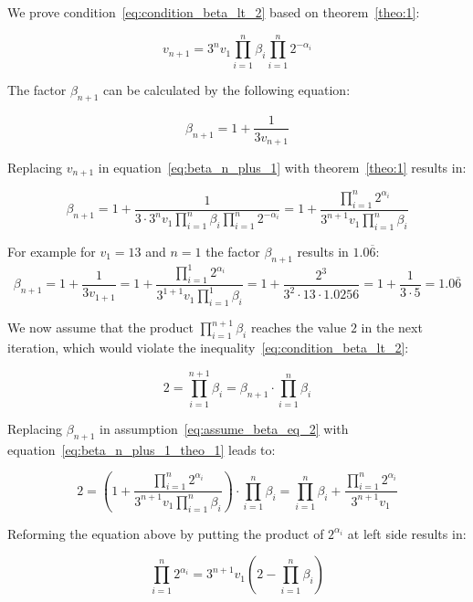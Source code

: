 We prove condition~\ref{eq:condition_beta_lt_2} based on theorem~\ref{theo:1}:

\begin{equation}
\label{eq:based_theo_1}
v_{n+1}=3^nv_1\prod_{i=1}^{n}\beta_i\prod_{i=1}^{n}2^{-\alpha_i}
\end{equation}

The factor $\beta_{n+1}$ can be calculated by the following equation:

\begin{equation}
\label{eq:beta_n_plus_1}
\beta_{n+1}=1+\frac{1}{3v_{n+1}}
\end{equation}

Replacing $v_{n+1}$ in equation~\ref{eq:beta_n_plus_1} with theorem~\ref{theo:1} results in:

\begin{equation}
\label{eq:beta_n_plus_1_theo_1}
\beta_{n+1}=1+\frac{1}{3\cdot3^nv_1\prod_{i=1}^{n}\beta_i\prod_{i=1}^{n}2^{-\alpha_i}}=1+\frac{\prod_{i=1}^{n}2^{\alpha_i}}{3^{n+1}v_1\prod_{i=1}^{n}\beta_i}
\end{equation}

\begin{example}
For example for $v_1=13$ and $n=1$ the factor $\beta_{n+1}$ results in $1.0\overline{6}$:
\[
\beta_{n+1}=1+\frac{1}{3v_{1+1}}=1+\frac{\prod_{i=1}^{1}2^{\alpha_i}}{3^{1+1}v_1\prod_{i=1}^{1}\beta_i}=1+\frac{2^3}{3^2\cdot13\cdot1.0256}=1+\frac{1}{3\cdot5}=1.0\overline{6}
\]
\end{example}

We now assume that the product $\prod_{i=1}^{n+1}\beta_i$ reaches the value $2$ in the next iteration, which would violate the inequality~\ref{eq:condition_beta_lt_2}:

\begin{equation}
\label{eq:assume_beta_eq_2}
2=\prod_{i=1}^{n+1}\beta_i=\beta_{n+1}\cdot\prod_{i=1}^{n}\beta_i
\end{equation}

Replacing $\beta_{n+1}$ in assumption~\ref{eq:assume_beta_eq_2} with equation~\ref{eq:beta_n_plus_1_theo_1} leads to:

\[
2=\left(1+\frac{\prod_{i=1}^{n}2^{\alpha_i}}{3^{n+1}v_1\prod_{i=1}^{n}\beta_i}\right)\cdot\prod_{i=1}^{n}\beta_i=\prod_{i=1}^{n}\beta_i+\frac{\prod_{i=1}^{n}2^{\alpha_i}}{3^{n+1}v_1}
\]

Reforming the equation above by putting the product of $2^{\alpha_i}$ at left side results in:

\begin{equation}
\label{eq:prod_power_of_two}
\prod_{i=1}^{n}2^{\alpha_i}=3^{n+1}v_1\left(2-\prod_{i=1}^{n}\beta_i\right)
\end{equation}

